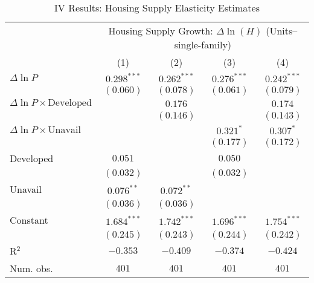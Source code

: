 
\begin{table}
\caption{IV Results: Housing Supply Elasticity Estimates}
\begin{center}
\begin{footnotesize}
\begin{threeparttable}
\begin{tabular}{l c c c c}
\toprule
 & \multicolumn{4}{c}{Housing Supply Growth: $\Delta\ln(H)$ (Units--single-family)} \\
\cmidrule(lr){2-5}
 & (1) & (2) & (3) & (4) \\
\midrule
$\Delta\ln P$                         & $0.298^{***}$ & $0.262^{***}$ & $0.276^{***}$ & $0.242^{***}$ \\
                                      & $(0.060)$     & $(0.078)$     & $(0.061)$     & $(0.079)$     \\
$\Delta\ln P\times{\text{Developed}}$ &               & $0.176$       &               & $0.174$       \\
                                      &               & $(0.146)$     &               & $(0.143)$     \\
$\Delta\ln P\times{\text{Unavail}}$   &               &               & $0.321^{*}$   & $0.307^{*}$   \\
                                      &               &               & $(0.177)$     & $(0.172)$     \\
Developed                             & $0.051$       &               & $0.050$       &               \\
                                      & $(0.032)$     &               & $(0.032)$     &               \\
Unavail                               & $0.076^{**}$  & $0.072^{**}$  &               &               \\
                                      & $(0.036)$     & $(0.036)$     &               &               \\
Constant                              & $1.684^{***}$ & $1.742^{***}$ & $1.696^{***}$ & $1.754^{***}$ \\
                                      & $(0.245)$     & $(0.243)$     & $(0.244)$     & $(0.242)$     \\
\midrule
R$^2$                                 & $-0.353$      & $-0.409$      & $-0.374$      & $-0.424$      \\
Num. obs.                             & $401$         & $401$         & $401$         & $401$         \\

\end{tabular}
\end{threeparttable}
\end{footnotesize}
\end{center}
\end{table}
